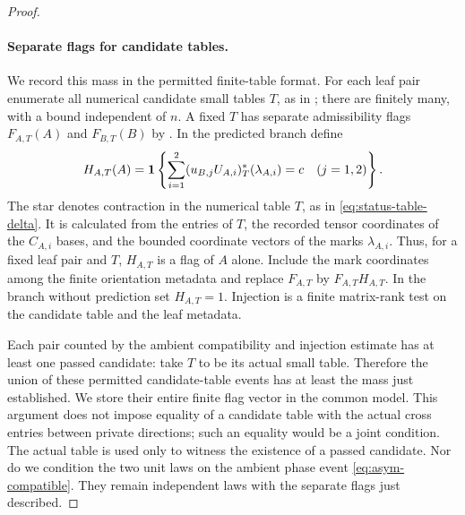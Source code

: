 \begin{proof}
\paragraph{Separate flags for candidate tables.}
We record this mass in the permitted finite-table format.
For each leaf pair enumerate all numerical candidate small
tables \(T\), as in ; there are finitely
many, with a bound independent of \(n\).  A fixed \(T\) has
separate admissibility flags \(F_{A,T}(A)\) and \(F_{B,T}(B)\)
by .  In the predicted branch define
\begin{equation}
\label{eq:asym-table-flag}
 H_{A,T}(A)=\mathbf 1\left\{
   \sum_{i=1}^2(u_{B,j}U_{A,i})^*_T(\lambda_{A,i})=c
       \quad(j=1,2)\right\}.
\end{equation}
The star denotes contraction in the numerical table \(T\),
as in \eqref{eq:status-table-delta}.  It is calculated from
the entries of \(T\), the recorded tensor coordinates of the
\(C_{A,i}\) bases, and the bounded coordinate vectors of the
marks \(\lambda_{A,i}\).  Thus, for a fixed leaf pair and
\(T\), \(H_{A,T}\) is a flag of \(A\) alone.  Include the
mark coordinates among the finite orientation metadata and
replace \(F_{A,T}\) by \(F_{A,T}H_{A,T}\).  In the branch
without prediction set \(H_{A,T}=1\).  Injection is a finite
matrix-rank test on the candidate table and the leaf metadata.

Each pair counted by the ambient compatibility and injection
estimate has at least one passed candidate: take \(T\) to be
its actual small table.  Therefore the union of these permitted
candidate-table events has at least the mass just established.
We store their entire finite flag vector in the common model.
This argument does not impose equality of a candidate table
with the actual cross entries between private directions;
such an equality would be a joint condition.  The actual table
is used only to witness the existence of a passed candidate.
Nor do we condition the two unit laws on the ambient phase
event \eqref{eq:asym-compatible}.  They remain independent
laws with the separate flags just described.


\end{proof}
